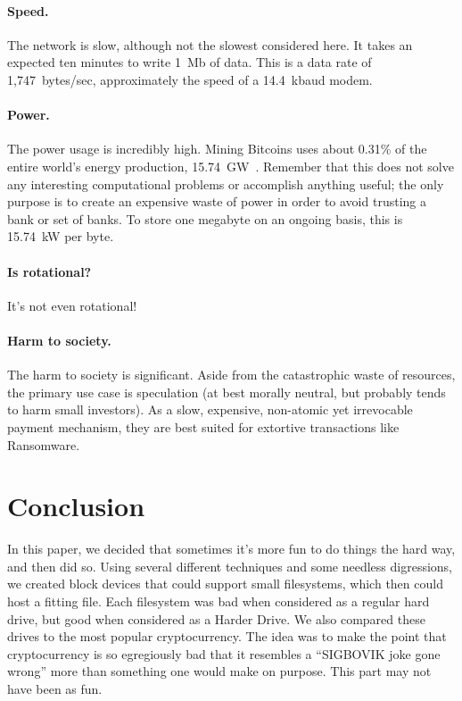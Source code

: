 \documentclass[twocolumn]{article}
\begin{document}
\paragraph{Speed.} The network is slow, although not the slowest considered
here. It takes an expected ten minutes to write 1~Mb of data. This is
a data rate of 1,747~bytes/sec, approximately the speed of a
14.4~kbaud modem.

\paragraph{Power.} The power usage is incredibly high. Mining Bitcoins
uses about 0.31\% of the entire world's energy production,
15.74~GW~\cite{cbeci}. Remember that this does not solve any
interesting computational problems or accomplish anything useful; the
only purpose is to create an expensive waste of power in order to
avoid trusting a bank or set of banks. To store one megabyte on an
ongoing basis, this is 15.74~kW per byte.

\paragraph{Is rotational?} It's not even rotational!

\paragraph{Harm to society.} The harm to society is significant. Aside
from the catastrophic waste of resources, the primary use case is
speculation (at best morally neutral, but probably tends to harm small
investors). As a slow, expensive, non-atomic yet irrevocable payment
mechanism, they are best suited for extortive transactions like
Ransomware.

\section{Conclusion}

In this paper, we decided that sometimes it's more fun to do things
the hard way, and then did so. Using several different techniques and
some needless digressions, we created block devices that could support
small filesystems, which then could host a fitting file. Each
filesystem was bad when considered as a regular hard drive, but good
when considered as a Harder Drive. We also compared these drives to
the most popular cryptocurrency. The idea was to make the point that
cryptocurrency is so egregiously bad that it resembles a ``SIGBOVIK
joke gone wrong'' more than something one would make on purpose. This
part may not have been as fun.
\end{document}
